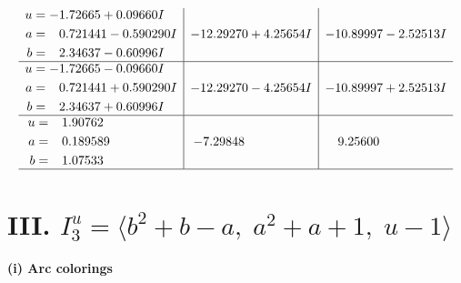 \documentclass[1p]{elsarticle_modified}
\theoremstyle{definition}
\begin{document}
$$\begin{array}{c|c|c}
\begin{aligned}
u &= -1.72665 + 0.09660 I \\
a &= \phantom{-}0.721441 - 0.590290 I \\
b &= \phantom{-}2.34637 - 0.60996 I\end{aligned}
 & -12.29270 + 4.25654 I & -10.89997 - 2.52513 I \\ \hline\begin{aligned}
u &= -1.72665 - 0.09660 I \\
a &= \phantom{-}0.721441 + 0.590290 I \\
b &= \phantom{-}2.34637 + 0.60996 I\end{aligned}
 & -12.29270 - 4.25654 I & -10.89997 + 2.52513 I \\ \hline\begin{aligned}
u &= \phantom{-}1.90762\phantom{ +0.000000I} \\
a &= \phantom{-}0.189589\phantom{ +0.000000I} \\
b &= \phantom{-}1.07533\phantom{ +0.000000I}\end{aligned}
 & -7.29848\phantom{ +0.000000I} & \phantom{-}9.25600\phantom{ +0.000000I}\\
 \hline 
 \end{array}$$\newpage\newpage\renewcommand{\arraystretch}{1}
\centering \section*{III. $I^u_{3}= \langle b^2+b- a,\;a^2+a+1,\;u-1 \rangle$}
\flushleft \textbf{(i) Arc colorings}\\
\end{document}
